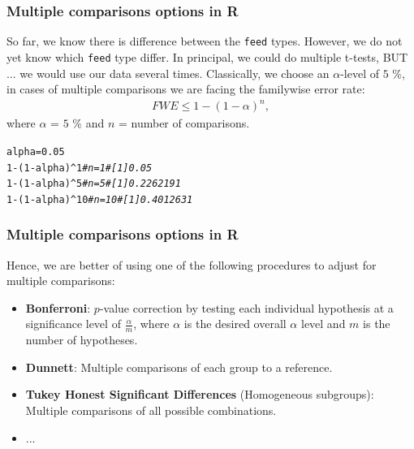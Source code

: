 \documentclass{beamer}\usepackage[]{graphicx}\usepackage[]{color}
\makeatletter
\newcommand{\hlnum}[1]{\textcolor[rgb]{0.686,0.059,0.569}{#1}}%
\newcommand{\hlcom}[1]{\textcolor[rgb]{0.678,0.584,0.686}{\textit{#1}}}%
\newcommand{\hlopt}[1]{\textcolor[rgb]{0,0,0}{#1}}%
\newcommand{\hlstd}[1]{\textcolor[rgb]{0.345,0.345,0.345}{#1}}%
\newcommand{\hlkwb}[1]{\textcolor[rgb]{0.69,0.353,0.396}{#1}}%
\newenvironment{kframe}{%
 \def\at@end@of@kframe{}%
 \ifinner\ifhmode%
  \def\at@end@of@kframe{\end{minipage}}%
  \begin{minipage}{\columnwidth}%
 \fi\fi%
 \def\FrameCommand##1{\hskip\@totalleftmargin \hskip-\fboxsep
 \colorbox{shadecolor}{##1}\hskip-\fboxsep
     \hskip-\linewidth \hskip-\@totalleftmargin \hskip\columnwidth}%
 \MakeFramed {\advance\hsize-\width
   \@totalleftmargin\z@ \linewidth\hsize
   \@setminipage}}%
 {\par\unskip\endMakeFramed%
 \at@end@of@kframe}
\newenvironment{knitrout}{}{} %
\makeatother
\begin{document}
{{{
\begin{frame}[fragile]
\frametitle{Multiple comparisons options in R}
So far, we know there is difference between the \texttt{feed} types. However,
we do not yet know which \texttt{feed} type differ. \newline
In principal, we could do multiple t-tests, BUT ... we would use our data several
times. Classically, we choose an $\alpha$-level of $5$ \%, in cases of multiple
comparisons we are facing the familywise error rate:
\begin{eqnarray}
FWE \leq 1 - (1 - \alpha)^n, \nonumber
\end{eqnarray}
where $\alpha$ = $5$ \% and $n$ = number of comparisons.
\begin{knitrout}
\color{fgcolor}\begin{kframe}
\begin{alltt}
\hlstd{alpha} \hlkwb{=} \hlnum{0.05}
\hlnum{1} \hlopt{-} \hlstd{(}\hlnum{1} \hlopt{-} \hlstd{alpha)}\hlopt{^}\hlnum{1}   \hlcom{# n = 1    # [1] 0.05}
\hlnum{1} \hlopt{-} \hlstd{(}\hlnum{1} \hlopt{-} \hlstd{alpha)}\hlopt{^}\hlnum{5}   \hlcom{# n = 5    # [1] 0.2262191}
\hlnum{1} \hlopt{-} \hlstd{(}\hlnum{1} \hlopt{-} \hlstd{alpha)}\hlopt{^}\hlnum{10}  \hlcom{# n = 10   # [1] 0.4012631}
\end{alltt}
\end{kframe}
\end{knitrout}
\end{frame}


\begin{frame}[fragile]
\frametitle{Multiple comparisons options in R}
Hence, we are better of using one of the following procedures to adjust for
multiple comparisons:
\begin{itemize}
\setlength\itemsep{1.1em}
\item \textbf{Bonferroni}: $p$-value correction by testing each individual
hypothesis at a significance level of $\frac{\alpha}{m}$,
where $\alpha$ is the desired overall $\alpha$ level and $m$ is the number of
hypotheses.
\item \textbf{Dunnett}: Multiple comparisons of each group to a reference.
\item \textbf{Tukey Honest Significant Differences} (Homogeneous subgroups): Multiple
comparisons of all possible combinations.
\item ...
\end{itemize}
\end{frame}

}}}
\end{document}
